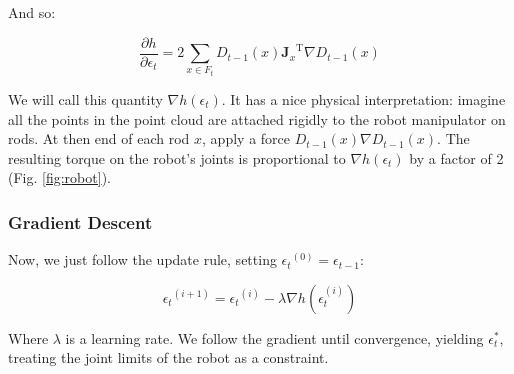 \documentclass{article}
\begin{document}
\noindent And so:

$$ \frac{\partial{h}}{\partial{\epsilon_t}} = 2\sum_{x \in F_t} D_{t-1}(x)
{\mathbf{J}_x}^{\text{T}} \nabla D_{t-1}(x) $$

\noindent We will call this quantity $\nabla h(\epsilon_t)$. It has a nice physical
interpretation: imagine all the points in the point cloud are attached rigidly
to the robot manipulator on rods. At then end of each rod $x$, apply a force
$D_{t - 1}(x) \nabla D_{t -1} (x)$. The resulting torque on the robot's joints 
is proportional to $\nabla h(\epsilon_t)$ by a factor of 2 (Fig. \ref{fig:robot}).

\subsubsection{Gradient Descent}

Now, we just follow the update rule, setting ${\epsilon_t}^{(0)} =
\epsilon_{t - 1}$:

$$ {\epsilon_t}^{(i + 1)} = {\epsilon_t}^{(i)} - \lambda \nabla
h(\epsilon_t^{(i)}) $$

\noindent Where $\lambda$ is a learning rate. We follow the gradient until
convergence, yielding $\epsilon^*_t$, treating the joint limits of the robot as
a constraint.
\end{document}
